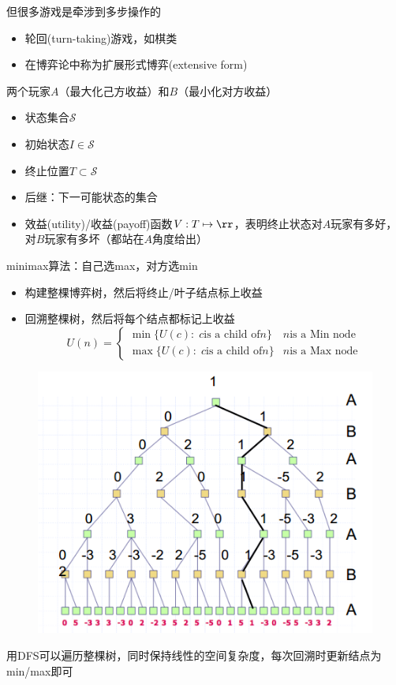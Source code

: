 但很多游戏是牵涉到多步操作的
\begin{itemize}
	\item 轮回(turn-taking)游戏，如棋类
	\item 在博弈论中称为扩展形式博弈(extensive form)
\end{itemize}

两个玩家$A$（最大化己方收益）和$B$（最小化对方收益）
\begin{itemize}
	\item 状态集合$\mathcal{S}$
	\item 初始状态$I\in\mathcal{S}$
	\item 终止位置$T\subset\mathcal{S}$
	\item 后继：下一可能状态的集合
	\item 效益(utility)/收益(payoff)函数$V:T\mapsto\rr$，表明终止状态对$A$玩家有多好，对$B$玩家有多坏（都站在$A$角度给出）
\end{itemize}

minimax算法：自己选max，对方选min
\begin{itemize}
	\item 构建整棵博弈树，然后将终止/叶子结点标上收益
	\item 回溯整棵树，然后将每个结点都标记上收益
\[U(n)=
\begin{cases}
\min\{U(c):\;c \text{is a child of} n\} & n \text{is a Min node}\\
\max\{U(c):\;c \text{is a child of} n\} & n \text{is a Max node}
\end{cases}\]
\end{itemize}
\begin{figure}[H]
\centering
\includegraphics[width=0.6\linewidth]{fig/game-tree.png}
\end{figure}

用DFS可以遍历整棵树，同时保持线性的空间复杂度，每次回溯时更新结点为min/max即可


